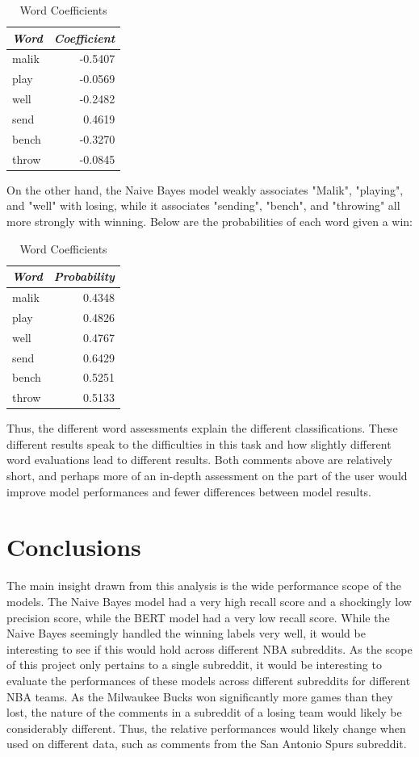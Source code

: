 \documentclass[twocolumn]{article}
\begin{document}
\begin{table}[H]
\centering
\begin{tabular}{l r}
\textit{Word} & \textit{Coefficient} \\ \hline
malik & -0.5407 \\
play & -0.0569 \\
well & -0.2482 \\
send & 0.4619 \\
bench & -0.3270 \\
throw & -0.0845 \\
\hline
\end{tabular}
\caption{Word Coefficients}
\label{tab:word_coefficients}
\end{table}

On the other hand, the Naive Bayes model weakly associates "Malik", "playing", and "well" with losing, while it associates "sending", "bench", and "throwing" all more strongly with winning. Below are the probabilities of each word given a  win:

\begin{table}[H]
\centering
\begin{tabular}{l r}
\textit{Word} & \textit{Probability} \\ \hline
malik & 0.4348 \\
play & 0.4826 \\
well & 0.4767 \\
send & 0.6429 \\
bench & 0.5251 \\
throw & 0.5133 \\
\hline
\end{tabular}
\caption{Word Coefficients}
\label{tab:word_probabilities}
\end{table}

Thus, the different word assessments explain the different classifications. These different results speak to the difficulties in this task and how slightly different word evaluations lead to different results. Both comments above are relatively short, and perhaps more of an in-depth assessment on the part of the user would improve model performances and fewer differences between model results.

\section{Conclusions}
The main insight drawn from this analysis is the wide performance scope of the models. The Naive Bayes model had a very high recall score and a shockingly low precision score, while the BERT model had a very low recall score. While the Naive Bayes seemingly handled the winning labels very well, it would be interesting to see if this would hold across different NBA subreddits. As the scope of this project only pertains to a single subreddit, it would be interesting to evaluate the performances of these models across different subreddits for different NBA teams. As the Milwaukee Bucks won significantly more games than they lost, the nature of the comments in a subreddit of a losing team would likely be considerably different. Thus, the relative performances would likely change when used on different data, such as comments from the San Antonio Spurs subreddit. 
\end{document}

